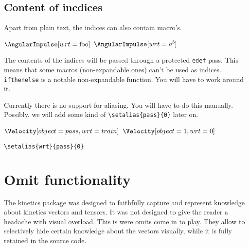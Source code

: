 \documentclass[10pt,a4paper]{article}
\begin{document}
\begin{SideBySideExample}
  \Transformation[frame=2,wrt=0,expressedIn=0]
\end{SideBySideExample}

\subsection{Content of incdices}

Apart from plain text, the indices can also contain macro's.
\begin{SideBySideExample}[xrightmargin=2cm,frame=single]
  \def\foo{0}
  \AngularImpulse[wrt=\foo]
  \newcommand{\frm}[1]{{\{#1\}}}
  \AngularImpulse[wrt=\frm{0}]
  \AngularImpulse[wrt=a\frm{0}c]
  $\AngularImpulse[wrt=\mathrm{foo}]$
  $\AngularImpulse[wrt=a^b]$
\end{SideBySideExample}

The contents of the indices will be passed through a protected \verb+edef+ pass. This means that some macros (non-expandable ones) can't be used as indices. \verb+ifthenelse+ is a notable non-expandable function. You will have to work around it.

\begin{SideBySideExample}[xrightmargin=2cm,frame=single]
  \AngularImpulse[wrt=\mywrt]
\end{SideBySideExample}

Currently there is no support for aliasing. You will have to do this manually. Possibly, we will add some kind of \verb+\setalias{pass}{0}+ later on.

\begin{SideBySideExample}[xrightmargin=1cm,frame=single]
  \def\pass{pass}
  \def\train{train}
  $\Velocity[object=\pass,wrt=\train]$
  \def\pass{1}
  \def\train{0}
  $\Velocity[object=\pass,wrt=\train]$
\end{SideBySideExample}

\verb+\setalias{wrt}{pass}{0}+



\section{Omit functionality}

The kinetics package was designed to faithfully capture and represent knowledge about kinetics vectors and tensors. It was not designed to give the reader a headache with visual overload. This is were omits come in to play. They allow to selectively hide certain knowledge about the vectors visually, while it is fully retained in the source code. 
\end{document}
